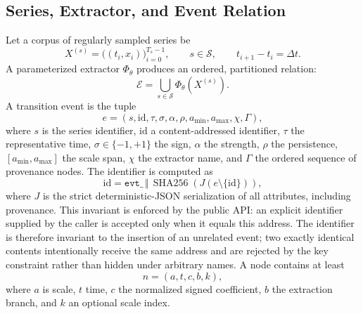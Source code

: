 \documentclass[11pt,a4paper]{article}
\newcommand{\Events}{\mathcal{E}}
\newcommand{\code}[1]{\texttt{#1}}
\begin{document}
\subsection{Series, Extractor, and Event Relation}

Let a corpus of regularly sampled series be
\begin{equation}
X^{(s)}=\bigl((t_i,x_i)\bigr)_{i=0}^{T_s-1},
\qquad s\in\mathcal{S},
\qquad t_{i+1}-t_i=\Delta t.
\end{equation}
A parameterized extractor $\Phi_{\theta}$ produces an ordered, partitioned relation:
\begin{equation}
\Events=\bigcup_{s\in\mathcal{S}}\Phi_{\theta}(X^{(s)}).
\end{equation}
A transition event is the tuple
\begin{equation}
 e=(s,\mathrm{id},\tau,\sigma,\alpha,\rho,a_{\min},a_{\max},\chi,\Gamma),
\end{equation}
where $s$ is the series identifier, $\mathrm{id}$ a content-addressed identifier, $\tau$ the representative time, $\sigma\in\{-1,+1\}$ the sign, $\alpha$ the strength, $\rho$ the persistence, $[a_{\min},a_{\max}]$ the scale span, $\chi$ the extractor name, and $\Gamma$ the ordered sequence of provenance nodes. The identifier is computed as
\begin{equation}
 \mathrm{id}=\code{evt\_}\,\Vert\,\operatorname{SHA256}\!\left(J(e\setminus\{\mathrm{id}\})\right),
\end{equation}
where $J$ is the strict deterministic-JSON serialization of all attributes, including provenance. This invariant is enforced by the public API: an explicit identifier supplied by the caller is accepted only when it equals this address. The identifier is therefore invariant to the insertion of an unrelated event; two exactly identical contents intentionally receive the same address and are rejected by the key constraint rather than hidden under arbitrary names. A node contains at least
\begin{equation}
 n=(a,t,c,b,k),
\end{equation}
where $a$ is scale, $t$ time, $c$ the normalized signed coefficient, $b$ the extraction branch, and $k$ an optional scale index.
\end{document}
